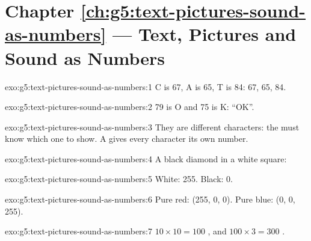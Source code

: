 \section*{Chapter \ref{ch:g5:text-pictures-sound-as-numbers} --- Text, Pictures and Sound as Numbers}

\begin{solution}{exo:g5:text-pictures-sound-as-numbers:1}
C is 67, A is 65, T is 84: 67, 65, 84.
\end{solution}

\begin{solution}{exo:g5:text-pictures-sound-as-numbers:2}
79 is O and 75 is K: ``OK''.
\end{solution}

\begin{solution}{exo:g5:text-pictures-sound-as-numbers:3}
They are different characters: the  must know which one to show. A
 gives every character its own number.
\end{solution}

\begin{solution}{exo:g5:text-pictures-sound-as-numbers:4}
A black diamond in a white square:
\begin{center}
\end{center}
\end{solution}

\begin{solution}{exo:g5:text-pictures-sound-as-numbers:5}
White: 255. Black: 0.
\end{solution}

\begin{solution}{exo:g5:text-pictures-sound-as-numbers:6}
Pure red: (255, 0, 0). Pure blue: (0, 0, 255).
\end{solution}

\begin{solution}{exo:g5:text-pictures-sound-as-numbers:7}
$10 \times 10 = 100$ , and $100 \times 3 = 300$ .
\end{solution}

